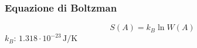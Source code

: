 \subsubsection{Equazione di Boltzman}
\begin{equation*}
S(A) = k_B\ln W(A)
\end{equation*}
\hyperref[tab:kB]{$k_B$}: $1.318\cdot10^{-23}\,\text{J/K}$
